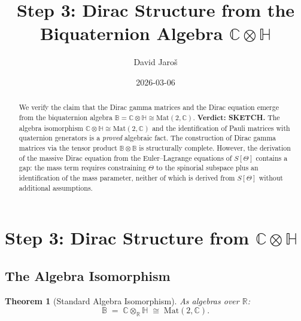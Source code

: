 \documentclass[12pt]{article}
\title{\textbf{Step 3: Dirac Structure from the Biquaternion Algebra $\mathbb{C}\otimes\mathbb{H}$}}
\author{David Jaroš}
\date{2026-03-06}
\newtheorem{theorem}{Theorem}[section]
\theoremstyle{definition}
\theoremstyle{remark}
\begin{document}
  \maketitle

  \begin{abstract}
  We verify the claim that the Dirac gamma matrices and the Dirac equation emerge from
  the biquaternion algebra $\mathbb{B} = \mathbb{C}\otimes\mathbb{H} \cong \mathrm{Mat}(2,\mathbb{C})$.
  \textbf{Verdict: SKETCH.}
  The algebra isomorphism $\mathbb{C}\otimes\mathbb{H} \cong \mathrm{Mat}(2,\mathbb{C})$ and the
  identification of Pauli matrices with quaternion generators is a \emph{proved} algebraic fact.
  The construction of Dirac gamma matrices via the tensor product $\mathbb{B}\otimes\mathbb{B}$
  is structurally complete.  However, the derivation of the massive Dirac equation from the
  Euler--Lagrange equations of $S[\Theta]$ contains a gap: the mass term requires
  constraining $\Theta$ to the spinorial subspace plus an identification of the mass parameter,
  neither of which is derived from $S[\Theta]$ without additional assumptions.
  \end{abstract}
\fi

\section{Step 3: Dirac Structure from $\mathbb{C}\otimes\mathbb{H}$}
\label{sec:dirac_emergence}

\subsection{The Algebra Isomorphism}

\begin{theorem}[Standard Algebra Isomorphism]
\label{thm:biquat_iso}
As algebras over $\mathbb{R}$:
\[
  \mathbb{B} \;=\; \mathbb{C}\otimes_\mathbb{R}\mathbb{H} \;\cong\; \mathrm{Mat}(2,\mathbb{C}).
\]
\end{theorem}
\end{document}
